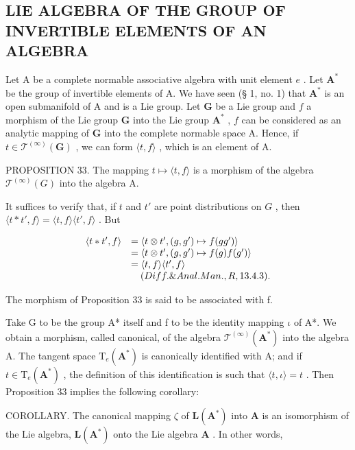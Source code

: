 \subsection{LIE ALGEBRA OF THE GROUP OF INVERTIBLE ELEMENTS OF AN ALGEBRA}

Let A be a complete normable associative algebra with unit element \(e\) . Let \(\mathbf{A}^*\) be the group of invertible elements of A. We have seen (§ 1, no. 1) that \(\mathbf{A}^*\) is an open submanifold of A and is a Lie group. Let \(\mathbf{G}\) be a Lie group and \(f\) a morphism of the Lie group \(\mathbf{G}\) into the Lie group \(\mathbf{A}^*\) , \(f\) can be considered as an analytic mapping of \(\mathbf{G}\) into the complete normable space A. Hence, if \(t \in \mathcal{T}^{(\infty)}(\mathbf{G})\) , we can form \(\langle t, f \rangle\) , which is an element of A.

PROPOSITION 33. The mapping \(t \mapsto \langle t, f \rangle\) is a morphism of the algebra \(\mathcal{T}^{(\infty)}(G)\) into the algebra A.

It suffices to verify that, if \(t\) and \(t'\) are point distributions on \(G\) , then \(\langle t * t', f \rangle = \langle t, f \rangle \langle t', f \rangle\) . But

\[
\begin{array}{r l} \langle t * t ^ {\prime}, f \rangle & = \langle t \otimes t ^ {\prime}, (g, g ^ {\prime}) \mapsto f (g g ^ {\prime}) \rangle \\ & = \langle t \otimes t ^ {\prime}, (g, g ^ {\prime}) \mapsto f (g) f (g ^ {\prime}) \rangle \\ & = \langle t, f \rangle \langle t ^ {\prime}, f \rangle \\ & \quad (Diff. \& Anal. Man., R, 13.4.3). \end{array}
\]

The morphism of Proposition 33 is said to be associated with f.

Take G to be the group A* itself and f to be the identity mapping \(\iota\) of A*. We obtain a morphism, called canonical, of the algebra \(\mathcal{T}^{(\infty)}(\mathbf{A}^*)\) into the algebra A. The tangent space \(\mathrm{T}_{e}(\mathbf{A}^*)\) is canonically identified with A; and if \(t \in \mathrm{T}_{e}(\mathbf{A}^*)\) , the definition of this identification is such that \(\langle t, \iota \rangle = t\) . Then Proposition 33 implies the following corollary:

COROLLARY. The canonical mapping \(\zeta\) of \(\mathbf{L}(\mathbf{A}^{*})\) into \(\mathbf{A}\) is an isomorphism of the Lie algebra, \(\mathbf{L}(\mathbf{A}^{*})\) onto the Lie algebra \(\mathbf{A}\) . In other words,

